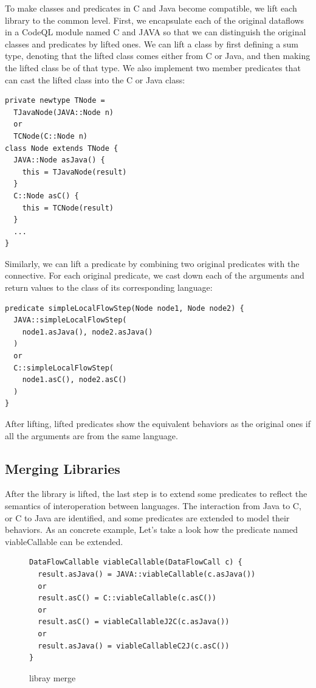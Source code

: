 To make classes and predicates in C and Java become compatible,
we lift each library to the common level.
First, we encapsulate each of the original dataflows in a CodeQL
module named C and JAVA so that we can distinguish the original
classes and predicates by lifted ones.
We can lift a class by first defining a sum type, denoting that
the lifted class comes either from C or Java, and then making the
lifted class be of that type.  We also implement two member predicates
that can cast the lifted class into the C or Java class:
\begin{lstlisting}[style=codeql,xleftmargin=2.5em]
private newtype TNode =
  TJavaNode(JAVA::Node n)
  or
  TCNode(C::Node n)
class Node extends TNode {
  JAVA::Node asJava() {
    this = TJavaNode(result)
  }
  C::Node asC() {
    this = TCNode(result)
  }
  ...
}
\end{lstlisting}
Similarly, we can lift a predicate by combining two original predicates with
the  connective. For each original predicate, we cast down
each of the arguments and return values to the class of its corresponding language:
\begin{lstlisting}[style=codeql,xleftmargin=2.5em]
predicate simpleLocalFlowStep(Node node1, Node node2) {
  JAVA::simpleLocalFlowStep(
    node1.asJava(), node2.asJava()
  )
  or
  C::simpleLocalFlowStep(
    node1.asC(), node2.asC()
  )
}
\end{lstlisting}
After lifting, lifted predicates show the equivalent behaviors as the
original ones if all the arguments are from the same language.


\subsection{Merging Libraries}
After the library is lifted, the last step is to extend some predicates to
reflect the semantics of interoperation between languages. The interaction from
Java to C, or C to Java are identified, and some predicates are extended to
model their behaviors. As an concrete example, Let's take a look how the predicate
named viableCallable can be extended.

\begin{figure}[t]
\begin{lstlisting}[style=codeql,xleftmargin=2.5em]
DataFlowCallable viableCallable(DataFlowCall c) {
  result.asJava() = JAVA::viableCallable(c.asJava())
  or
  result.asC() = C::viableCallable(c.asC())
  or
  result.asC() = viableCallableJ2C(c.asJava())
  or
  result.asJava() = viableCallableC2J(c.asC())
}
\end{lstlisting}
\caption{libray merge}
\end{figure}

